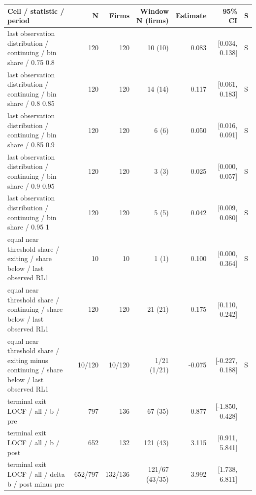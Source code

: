 \begin{threeparttable}
\begin{tabular}{p{5.7cm}rrrrrl}
\toprule
Cell / statistic / period & N & Firms & Window N (firms) & Estimate & 95\% CI & S \\
\midrule
last observation distribution / continuing / bin share / 0.75 0.8 & 120 & 120 & 10 (10) & 0.083 & [0.034, 0.138] & S \\
last observation distribution / continuing / bin share / 0.8 0.85 & 120 & 120 & 14 (14) & 0.117 & [0.061, 0.183] & S \\
last observation distribution / continuing / bin share / 0.85 0.9 & 120 & 120 & 6 (6) & 0.050 & [0.016, 0.091] & S \\
last observation distribution / continuing / bin share / 0.9 0.95 & 120 & 120 & 3 (3) & 0.025 & [0.000, 0.057] & S \\
last observation distribution / continuing / bin share / 0.95 1 & 120 & 120 & 5 (5) & 0.042 & [0.009, 0.080] & S \\
equal near threshold share / exiting / share below / last observed RL1 & 10 & 10 & 1 (1) & 0.100 & [0.000, 0.364] & S \\
equal near threshold share / continuing / share below / last observed RL1 & 120 & 120 & 21 (21) & 0.175 & [0.110, 0.242] &  \\
equal near threshold share / exiting minus continuing / share below / last observed RL1 & 10/120 & 10/120 & 1/21 (1/21) & -0.075 & [-0.227, 0.188] & S \\
terminal exit LOCF / all / b / pre & 797 & 136 & 67 (35) & -0.877 & [-1.850, 0.428] &  \\
terminal exit LOCF / all / b / post & 652 & 132 & 121 (43) & 3.115 & [0.911, 5.841] &  \\
terminal exit LOCF / all / delta b / post minus pre & 652/797 & 132/136 & 121/67 (43/35) & 3.992 & [1.738, 6.811] &  \\
\bottomrule
\end{tabular}
\begin{tablenotes}[flushleft]\footnotesize

\end{tablenotes}
\end{threeparttable}
